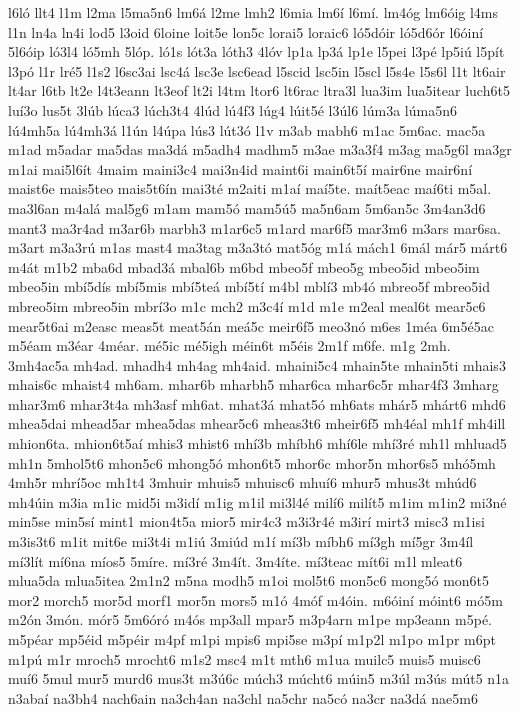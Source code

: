 {l6ló
llt4
l1m
l2ma
l5ma5n6
lm6á
l2me
lmh2
l6mia
lm6í
l6mí.
lm4óg
lm6óig
l4ms
l1n
ln4a
ln4i
lod5
l3oid
6loine
loit5e
lon5c
lorai5
loraic6
ló5dóir
ló5d6ór
l6óiní
5l6óip
ló3l4
ló5mh
5lóp.
ló1s
lót3a
lóth3
4lóv
lp1a
lp3á
lp1e
l5pei
l3pé
lp5iú
l5pít
l3pó
l1r
lré5
l1s2
l6sc3ai
lsc4á
lsc3e
lsc6ead
l5scid
lsc5in
l5scl
l5s4e
l5s6l
l1t
lt6air
lt4ar
l6tb
lt2e
l4t3eann
lt3eof
lt2i
l4tm
ltor6
lt6rac
ltra3l
lua3im
lua5itear
luch6t5
luí3o
lus5t
3lúb
lúca3
lúch3t4
4lúd
lú4f3
lúg4
lúit5é
l3úl6
lúm3a
lúma5n6
lú4mh5a
lú4mh3á
l1ún
l4úpa
lús3
lút3ó
l1v
m3ab
mabh6
m1ac
5m6ac.
mac5a
m1ad
m5adar
ma5das
ma3dá
m5adh4
madhm5
m3ae
m3a3f4
m3ag
ma5g6l
ma3gr
m1ai
mai5l6ít
4maim
maini3c4
mai3n4id
maint6i
main6t5í
mair6ne
mair6ní
maist6e
mais5teo
mais5t6ín
mai3té
m2aiti
m1aí
maí5te.
maít5eac
maí6ti
m5al.
ma3l6an
m4alá
mal5g6
m1am
mam5ó
mam5ú5
ma5n6am
5m6an5c
3m4an3d6
mant3
ma3r4ad
m3ar6b
marbh3
m1ar6c5
m1ard
mar6f5
mar3m6
m3ars
mar6sa.
m3art
m3a3rú
m1as
mast4
ma3tag
m3a3tó
mat5óg
m1á
mách1
6mál
már5
márt6
m4át
m1b2
mba6d
mbad3á
mbal6b
m6bd
mbeo5f
mbeo5g
mbeo5id
mbeo5im
mbeo5in
mbí5dís
mbí5mis
mbí5teá
mbí5tí
m4bl
mblí3
mb4ó
mbreo5f
mbreo5id
mbreo5im
mbreo5in
mbrí3o
m1c
mch2
m3c4í
m1d
m1e
m2eal
meal6t
mear5c6
mear5t6ai
m2easc
meas5t
meat5án
meá5c
meir6f5
meo3nó
m6es
1méa
6m5é5ac
m5éam
m3éar
4méar.
mé5ic
mé5igh
méin6t
m5éis
2m1f
m6fe.
m1g
2mh.
3mh4ac5a
mh4ad.
mhadh4
mh4ag
mh4aid.
mhaini5c4
mhain5te
mhain5ti
mhais3
mhais6c
mhaist4
mh6am.
mhar6b
mharbh5
mhar6ca
mhar6c5r
mhar4f3
3mharg
mhar3m6
mhar3t4a
mh3asf
mh6at.
mhat3á
mhat5ó
mh6ats
mhár5
mhárt6
mhd6
mhea5dai
mhead5ar
mhea5das
mhear5c6
mheas3t6
mheir6f5
mh4éal
mh1f
mh4ill
mhion6ta.
mhion6t5aí
mhis3
mhist6
mhí3b
mhíbh6
mhí6le
mhí3ré
mh1l
mhluad5
mh1n
5mhol5t6
mhon5c6
mhong5ó
mhon6t5
mhor6c
mhor5n
mhor6s5
mhó5mh
4mh5r
mhrí5oc
mh1t4
3mhuir
mhuis5
mhuisc6
mhuí6
mhur5
mhus3t
mhúd6
mh4úin
m3ia
m1ic
mid5i
m3idí
m1ig
m1il
mi3l4é
milí6
milít5
m1im
m1in2
mi3né
min5se
min5sí
mint1
mion4t5a
mior5
mir4c3
m3i3r4é
m3irí
mirt3
misc3
m1isi
m3is3t6
m1it
mit6e
mi3t4i
m1iú
3miúd
m1í
mí3b
míbh6
mí3gh
mí5gr
3m4íl
mí3lít
mí6na
míos5
5míre.
mí3ré
3m4ít.
3m4íte.
mí3teac
mít6i
m1l
mleat6
mlua5da
mlua5itea
2m1n2
m5na
modh5
m1oi
mol5t6
mon5c6
mong5ó
mon6t5
mor2
morch5
mor5d
morf1
mor5n
mors5
m1ó
4móf
m4óin.
m6óiní
móint6
mó5m
m2ón
3món.
mór5
5m6óró
m4ós
mp3all
mpar5
m3p4arn
m1pe
mp3eann
m5pé.
m5péar
mp5éid
m5péir
m4pf
m1pi
mpis6
mpi5se
m3pí
m1p2l
m1po
m1pr
m6pt
m1pú
m1r
mroch5
mrocht6
m1s2
msc4
m1t
mth6
m1ua
muilc5
muis5
muisc6
muí6
5mul
mur5
murd6
mus3t
m3ú6c
múch3
múcht6
múin5
m3úl
m3ús
mút5
n1a
n3abaí
na3bh4
nach6ain
na3ch4an
na3chl
na5chr
na5có
na3cr
na3dá
nae5m6
}
